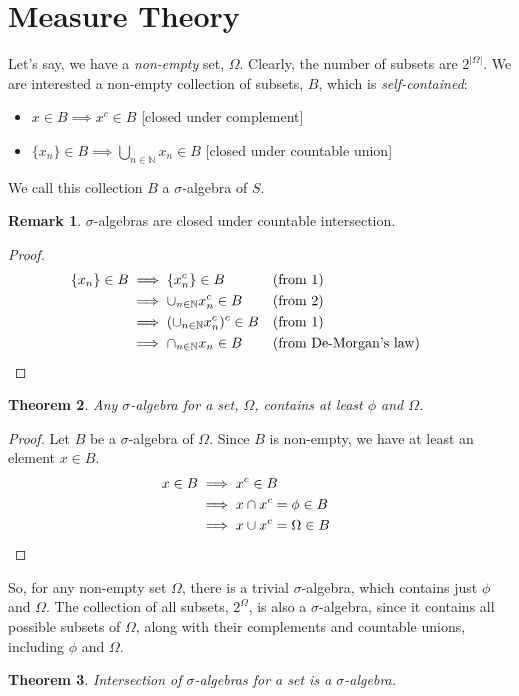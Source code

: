 \documentclass{report}
\theoremstyle{plain}
\newtheorem{theorem}{Theorem}[chapter] %
\theoremstyle{definition}
\newtheorem{remark}[theorem]{Remark} %
\begin{document}
\section{Measure Theory}
Let's say, we have a \emph{non-empty} set, $\Omega$. Clearly, the number of subsets are $2^{|\Omega|}$. We are interested a non-empty collection of subsets, $B$, which is \emph{self-contained}:
\begin{itemize}
\item[(1)] $x\in B\implies x^c\in B$ [closed under complement]
\item[(2)] $\{x_n\}\in B\implies \bigcup_{n\in\mathbb{N}} x_n \in B$ [closed under countable union]
\end{itemize}
\noindent We call this collection $B$ a $\sigma$-algebra of $S$.
\begin{remark}
$\sigma$-algebras are closed under countable intersection.
\end{remark}
\begin{proof}
\begin{align}
\{x_n\}\in B
&\implies \{x_n^c\}\in B &&\text{(from 1)} \\
&\implies \cup_{n\in\mathbb{N}} x_n^c \in B &&\text{(from 2)}\\
&\implies (\cup_{n\in\mathbb{N}} x_n^c )^c\in B &&\text{(from 1)} \\
&\implies \cap_{n\in\mathbb{N}} x_n \in B &&\text{(from De-Morgan's law)}&&\qedhere
\end{align}
\end{proof}
\begin{theorem}
Any $\sigma$-algebra for a set, $\Omega$, contains at least $\phi$ and $\Omega$.
\end{theorem}
\begin{proof}
Let $B$ be a $\sigma$-algebra of $\Omega$. Since $B$ is non-empty, we have at least an element $x\in B$.
\begin{align}
x\in B
&\implies x^c\in B \\
&\implies x\cap x^c=\phi\in B \\
&\implies x\cup x^c=\Omega\in B &&\qedhere
\end{align}
\end{proof}
\noindent So, for any non-empty set $\Omega$, there is a trivial $\sigma$-algebra, which contains just $\phi$ and $\Omega$. The collection of all subsets, $2^\Omega$, is also a $\sigma$-algebra, since it contains all possible subsets of $\Omega$, along with their complements and countable unions, including $\phi$ and $\Omega$.
\begin{theorem}
Intersection of $\sigma$-algebras for a set is a $\sigma$-algebra.
\end{theorem}
\end{document}
